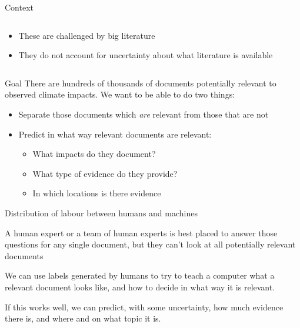 \documentclass[9pt]{beamer}
\begin{document}
\begin{frame}{Context}
\begin{columns}
\begin{column}{0.312\linewidth}
		\begin{itemize}
			\small
			\item<2->These are challenged by big literature 
			\item<3->They do not account for uncertainty about what literature is available
		\end{itemize}
	\end{column}
\end{columns}

\end{frame}

\begin{frame}{Goal}
There are hundreds of thousands of documents potentially relevant to observed climate impacts. We want to be able to do two things:

\begin{itemize}
	\item<2-> Separate those documents which \textit{are} relevant from those that are not
	\item<3-> Predict in what way relevant documents are relevant:
	\begin{itemize}
		\item What impacts do they document?
		\item What type of evidence do they provide?
		\item In which locations is there evidence
	\end{itemize}
\end{itemize}


\end{frame}



\begin{frame}{Distribution of labour between humans and machines}

A human expert or a team of human experts is best placed to answer those questions for any single document, but they can't look at all potentially relevant documents

\bigskip

We can use labels generated by humans to try to teach a computer what a relevant document looks like, and how to decide in what way it is relevant. 

\bigskip

If this works well, we can predict, with some uncertainty, how much evidence there is, and where and on what topic it is.

\end{frame}
\end{document}
